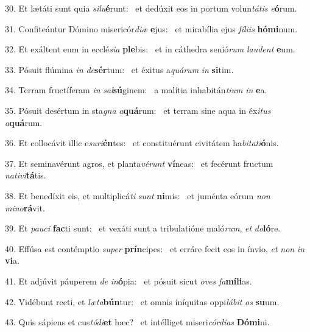 30. Et lætáti sunt quia \textit{si}\textit{lu}\textbf{é}runt: \ast\  et dedúxit eos in portum volun\textit{tá}\textit{tis} \textit{e}\textbf{ó}rum.\

31. Confiteántur Dómino misericór\textit{di}\textit{æ} \textbf{e}jus: \ast\  et mirabília ejus \textit{fí}\textit{li}\textit{is} \textbf{hó}\textbf{mi}num.\

32. Et exáltent eum in ecclé\textit{si}\textit{a} \textbf{ple}bis: \ast\  et in cáthedra senió\textit{rum} \textit{lau}\textit{dent} \textbf{e}um.\

33. Pósuit flúmina \textit{in} \textit{de}\textbf{sér}tum: \ast\  et éxitus a\textit{quá}\textit{rum} \textit{in} \textbf{si}tim.\

34. Terram fructíferam \textit{in} \textit{sal}\textbf{sú}ginem: \ast\  a malítia inhabitán\textit{ti}\textit{um} \textit{in} \textbf{e}a.\

35. Pósuit desértum in sta\textit{gna} \textit{a}\textbf{quá}rum: \ast\  et terram sine aqua in éx\textit{i}\textit{tus} \textit{a}\textbf{quá}rum.\

36. Et collocávit illic e\textit{su}\textit{ri}\textbf{én}tes: \ast\  et constituérunt civitátem ha\textit{bi}\textit{ta}\textit{ti}\textbf{ó}nis.\

37. Et seminavérunt agros, et planta\textit{vé}\textit{runt} \textbf{ví}neas: \ast\  et fecérunt fructum \textit{na}\textit{ti}\textit{vi}\textbf{tá}tis.\

38. Et benedíxit eis, et multiplicá\textit{ti} \textit{sunt} \textbf{ni}mis: \ast\  et juménta eórum \textit{non} \textit{mi}\textit{no}\textbf{rá}vit.\

39. Et \textit{pau}\textit{ci} \textbf{fac}ti sunt: \ast\  et vexáti sunt a tribulatióne maló\textit{rum}, \textit{et} \textit{do}\textbf{ló}re.\

40. Effúsa est contémptio \textit{su}\textit{per} \textbf{prín}cipes: \ast\  et erráre fecit eos in ínvio, \textit{et} \textit{non} \textit{in} \textbf{vi}a.\

41. Et adjúvit páuperem \textit{de} \textit{in}\textbf{ó}pia: \ast\  et pósuit sicut \textit{o}\textit{ves} \textit{fa}\textbf{mí}\textbf{li}as.\

42. Vidébunt recti, et \textit{læ}\textit{ta}\textbf{bún}tur: \ast\  et omnis iníquitas oppi\textit{lá}\textit{bit} \textit{os} \textbf{su}um.\

43. Quis sápiens et cus\textit{tó}\textit{di}\textbf{et} hæc? \ast\  et intélliget miseri\textit{cór}\textit{di}\textit{as} \textbf{Dó}\textbf{mi}ni.\

